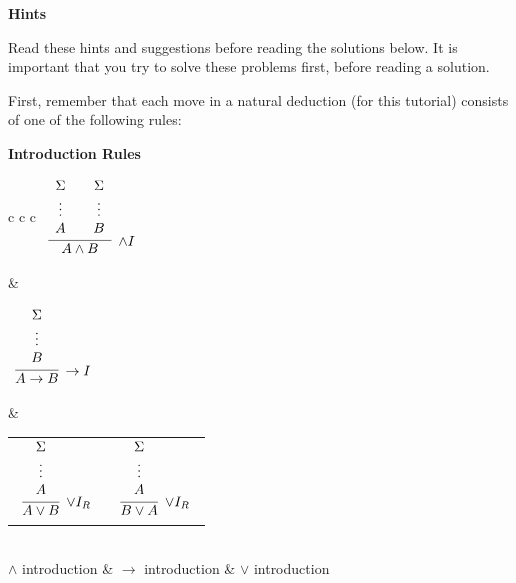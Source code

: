 \documentclass[11pt]{report}
\begin{document}
\newpage
\textbf{Hints}

Read these hints and suggestions before reading the solutions below. It is important that you try to solve these problems first, before reading a solution. 

First, remember that each move in a natural deduction (for this tutorial) consists of one of the following rules: 

\begin{center}
	\textbf{Introduction Rules}
\end{center}
\begin{scriptsize}
\begin{center}
	\begin{tabular}{c c c}
	$\begin{array}{c}\infer[\land I]{A \land B}		
		{\begin{array}{c} \Sigma \\ \vdots \\ A \end{array}
		&
		\begin{array}{c} \Sigma \\ \vdots \\ B \end{array}}
	\end{array}$

		\hspace{5mm}		
		&	
		\hspace{5mm}

	$\begin{array}{c}\infer[\to I]{A \to B}
		{\begin{array}{c} \Sigma \\ \vdots \\ B \end{array}}
	\end{array}$ 

		\hspace{5mm}
		&
		\hspace{5mm}

	\begin{tabular}{c c}
		$\begin{array}{c}\infer[\lor I_{R}]{A \lor B}
		{\begin{array}{c} \Sigma \\ \vdots \\ A \end{array}}\end{array}$
		&
		$\begin{array}{c}\infer[\lor I_{R}]{B \lor A}
		{\begin{array}{c} \Sigma \\ \vdots \\ A \end{array}}\end{array}$
	\end{tabular}\\
	$\land$ introduction & $\to$ introduction & $\lor$ introduction
	\end{tabular}
\end{center}
\end{scriptsize}
\end{document}
